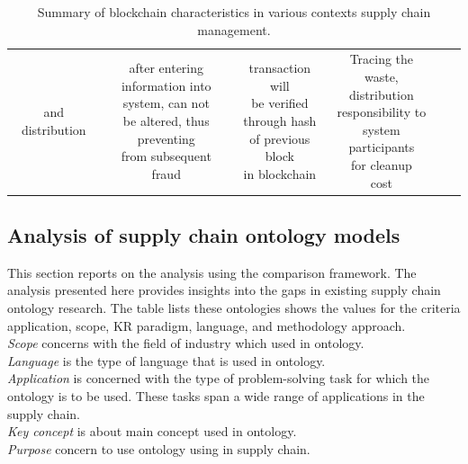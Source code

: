 \begin{table}[h!]
\begin{center}
\begin{adjustwidth}{-1cm}{}
\begin{tabular} { c | c | c | c | c | c }
{					and distribution} & \tiny \makecell{after entering\\ information into\\ system, can not\\ be altered, thus preventing\\ from subsequent\\ fraud} & \tiny \makecell{transaction will\\ be verified\\ through hash\\ of previous block\\ in blockchain} & \tiny \makecell{Tracing the waste, \\distribution\\ responsibility to\\ system participants \\for cleanup\\ cost}
				
				
				
			\end{tabular}
		\end{adjustwidth}
		\caption {Summary of blockchain characteristics in various contexts supply chain management.}
	\end{center}
\end{table}

\subsection{Analysis of supply chain ontology models}

This section reports on the analysis using the comparison
framework. The analysis presented here provides insights into
the gaps in existing supply chain ontology research. The table lists these ontologies shows the
values for the criteria application, scope, KR paradigm, language, and methodology approach.\\
\textit{Scope} concerns with the field of industry which used in ontology.\\
\textit{Language} is the type of language that is used in ontology.\\
\textit{Application} is concerned with the type of problem-solving task for which the ontology is to be used.
These tasks span a wide range of applications in the supply chain.\\
\textit{Key concept} is about main concept used in ontology.\\
\textit{Purpose} concern to use ontology using in supply chain\cite{Tonci}.\\ 


